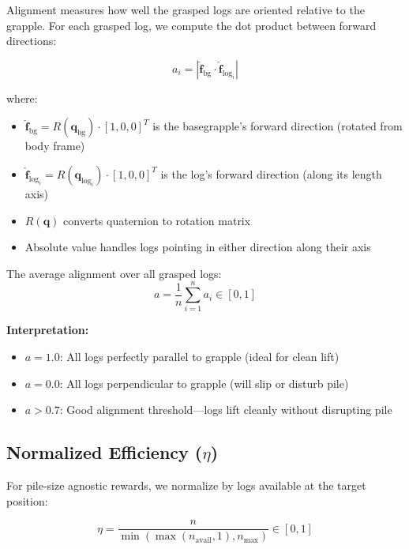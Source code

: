 \documentclass[11pt]{article}
\begin{document}
Alignment measures how well the grasped logs are oriented relative to the grapple. For each grasped log, we compute the dot product between forward directions:

\begin{equation}
    a_i = \left| \hat{\mathbf{f}}_{\text{bg}} \cdot \hat{\mathbf{f}}_{\text{log}_i} \right|
\end{equation}

where:
\begin{itemize}
    \item $\hat{\mathbf{f}}_{\text{bg}} = R(\mathbf{q}_{\text{bg}}) \cdot [1, 0, 0]^T$ is the basegrapple's forward direction (rotated from body frame)
    \item $\hat{\mathbf{f}}_{\text{log}_i} = R(\mathbf{q}_{\text{log}_i}) \cdot [1, 0, 0]^T$ is the log's forward direction (along its length axis)
    \item $R(\mathbf{q})$ converts quaternion to rotation matrix
    \item Absolute value handles logs pointing in either direction along their axis
\end{itemize}

The average alignment over all grasped logs:
\begin{equation}
    a = \frac{1}{n} \sum_{i=1}^{n} a_i \in [0, 1]
\end{equation}

\textbf{Interpretation:}
\begin{itemize}
    \item $a = 1.0$: All logs perfectly parallel to grapple (ideal for clean lift)
    \item $a = 0.0$: All logs perpendicular to grapple (will slip or disturb pile)
    \item $a > 0.7$: Good alignment threshold---logs lift cleanly without disrupting pile
\end{itemize}

\subsection{Normalized Efficiency ($\eta$)}

For pile-size agnostic rewards, we normalize by logs available at the target position:

\begin{equation}
    \eta = \frac{n}{\min\left(\max(n_{\text{avail}}, 1), n_{\text{max}}\right)} \in [0, 1]
\end{equation}
\end{document}
